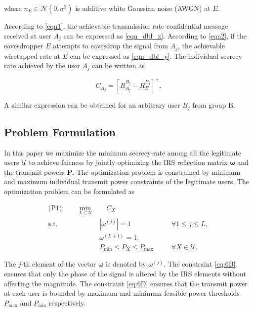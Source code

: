 \documentclass[lettersize,journal]{IEEEtran}
\begin{document}
\noindent where $n_{E} \in \mathcal{N}(0,\sigma^2)$ is additive white Gaussian noise (AWGN) at $E$.

According to \eqref{eqn1}, the achievable transmission rate confidential message received at user $A_j$ can be expressed as \eqref{eqn_dbl_x}. According to \eqref{eqn2}, if the eavesdropper $E$ attempts to eavesdrop the signal from $A_j$, the achievable wiretapped rate at $E$ can be expressed as \eqref{eqn_dbl_y}. The individual secrecy-rate achieved by the user $A_j$ can be written as

\begin{equation}
\label{eqn3}
C_{A_j} = \left[R_{A_j}^{B_j} - R_{E}^{B_j} \right]^{+}.
\end{equation}

A similar expression can be obtained for an arbitrary user 
$B_j$ from group B.


\subsection{Problem Formulation}

In this paper we maximize the minimum secrecy-rate among all the legitimate users $\mathcal{U}$ to achieve fairness by jointly optimizing the IRS reflection matrix $ \boldsymbol{\omega} $ and the transmit powers $\mathbf{P}$. The optimization problem is constrained by minimum and maximum individual transmit power constraints of the legitimate users. The optimization problem can be formulated as



\begin{subequations}\label{eq:6}
\begin{align}
\text{(P1):} \quad \mathop{\max_{\boldsymbol{\omega},\mathbf{P}}} \; \min_{X\in\mathcal{U}} & \quad  C_{X} \label{eq:6A}\\
\textrm{s.t.} \quad & |\omega^{(j)}| = 1 & \quad & \forall 1 \leq j \leq L, \label{eq:6B}\\
  &\omega^{(L+1)} = 1 ,   \label{eq:6C}\\ & P_{\text{min}} \leq P_{X} \leq P_{\text{max}} & \quad & \forall X\in\mathcal{U}. \label{eq:6D}
\end{align}
\end{subequations}

The $j$-th element of the vector $\boldsymbol{\omega}$ is denoted by $\omega^{(j)}$. The constraint \eqref{eq:6B} ensures that only the phase of the signal is altered by the IRS elements without affecting the magnitude. The constraint \eqref{eq:6D} ensures that the transmit power at each user is bounded by maximum and minimum feasible power thresholds $P_{\text{max}}$ and $P_{\text{min}}$ respectively. 
\end{document}
